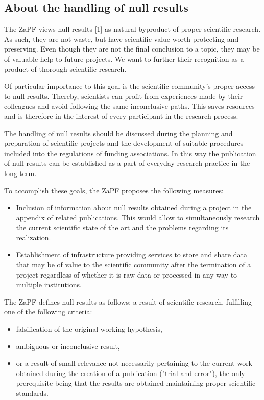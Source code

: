 
\subsection*{About the handling of null results}
The ZaPF views null results [1] as natural byproduct of proper scientific research. As such, they are not waste, but have scientific value worth protecting and preserving. Even though they are not the final conclusion to a topic, they may be of valuable help to future projects. We want to further their recognition as a product of thorough scientific research.

Of particular importance to this goal is the scientific community's proper access to null results. Thereby, scientists can profit from experiences made by their colleagues and avoid following the same inconclusive paths. This saves resources and is therefore in the interest of every participant in the research process.

The handling of null results should be discussed during the planning and preparation of scientific projects and the development of suitable procedures included into the regulations of funding associations. In this way the publication of null results can be established as a part of everyday research practice in the long term.

To accomplish these goals, the ZaPF proposes the following measures:
\begin{itemize}
  \item Inclusion of information about null results obtained during a project in the appendix of related publications. This would allow to simultaneously research the current scientific state of the art and the problems regarding its realization.
  \item Establishment of infrastructure providing services to store and share data that may be of value to the scientific community after the termination of a project regardless of whether it is raw data or processed in any way to multiple institutions.
\end{itemize}
\newpage
[1] The ZaPF defines null results as follows: a result of scientific research, fulfilling one of the following criteria:
\begin{itemize}
  \item falsification of the original working hypothesis,
  \item ambiguous or inconclusive result,
  \item or a result of small relevance not necessarily pertaining to the current work obtained during the creation of a publication ("trial and error"),
    the only prerequisite being that the results are obtained maintaining proper scientific standards.
\end{itemize}
